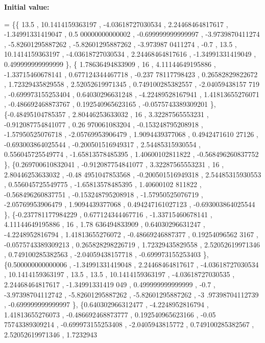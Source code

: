 {\bfseries Initial value\+:}
\begin{DoxyCode}
= \{\{             13.5 ,  10.1414159363197 , -4.03618727030534 ,  2.24468464817617 , -1.34991331419047 , 0.5
      00000000000002 , -0.699999999999997 ,  -3.9739870411274 , -5.82601295887262 , -5.82601295887262 ,  -3.973987
      0411274 ,              -0.7 ,              13.5 ,  10.1414159363197 , -4.03618727030534 ,  2.24468464817616 
      , -1.34991331419049 , 0.499999999999999 \},
\{ 1.78636494833909 ,                16 ,  4.11144649195886 , -1.33715460678141 , 0.677124344467718 , -0.237
      78117798423 ,  0.26582829822672 ,  1.72329435829558 ,  2.52052619971345 , 0.749100285382557 , -2.04059438157
      719 , -0.699973155253404 ,  0.64030296631248 , -4.22489528167941 ,  1.41813655276071 , -0.486692468873767 , 
      0.192540965623165 , -0.0575743389309201 \},
\{-0.48495104785357 ,  2.80446253633032 ,                16 ,  3.32287565553231 , -0.912087754841077 ,  0.26
      970061083204 , -0.153248795208918 , -1.57950525076718 , -2.05769953906479 ,   1.9094439377068 , 0.4942471610
      27126 , -0.693003864025544 , -0.200501516949317 ,  2.54485315930554 , 0.556045725549774 , -1.65813578485395 
      ,  1.40600102811822 , -0.568496260837752 \},
\{0.269700610832041 , -0.912087754841077 ,  3.32287565553231 ,                16 ,  2.80446253633032 , -0.48
      4951047853568 , -0.200501516949318 ,  2.54485315930553 , 0.556045725549775 , -1.65813578485395 ,  1.40600102
      811822 , -0.568496260837751 , -0.153248795208918 , -1.57950525076719 , -2.05769953906479 ,   1.9094439377068
       , 0.494247161027123 , -0.693003864025544 \},
\{-0.237781177984229 , 0.677124344467716 , -1.33715460678141 ,  4.11144649195886 ,                16 ,  1.78
      636494833909 ,  0.64030296631247 ,  -4.2248952816794 ,  1.41813655276072 , -0.48669246887377 , 0.19254096562
      3167 , -0.0575743389309213 , 0.265828298226719 ,  1.72329435829558 ,  2.52052619971346 , 0.749100285382563 ,
       -2.04059438157718 , -0.699973155253403 \},
\{0.500000000000006 , -1.34991331419048 ,  2.24468464817617 , -4.03618727030534 ,  10.1414159363197 ,       
             13.5 ,              13.5 ,  10.1414159363197 , -4.03618727030535 ,  2.24468464817617 , -1.34991331419
      049 , 0.499999999999999 ,              -0.7 , -3.97398704112742 , -5.82601295887262 , -5.82601295887262 , -3
      .97398704112739 , -0.699999999999997 \},
\{0.640302966312477 ,  -4.2248952816794 ,  1.41813655276073 , -0.486692468873777 , 0.192540965623166 , -0.05
      75743389309214 , -0.699973155253408 ,  -2.0405943815772 , 0.749100285382567 ,  2.52052619971346 ,  1.7232943

\end{DoxyCode}

